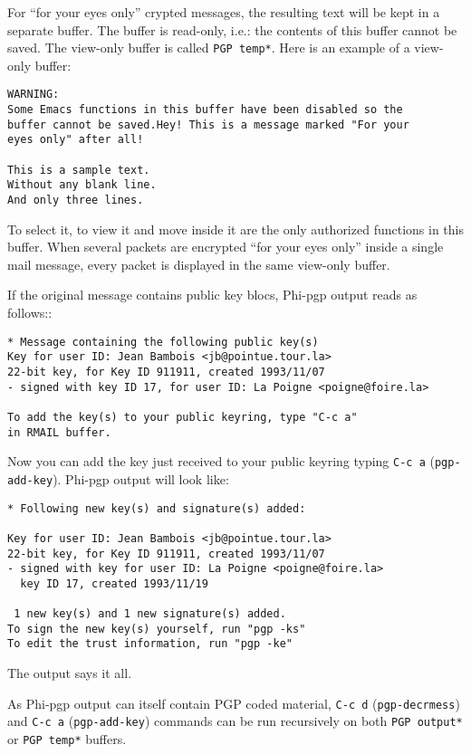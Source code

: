 For  ``for your eyes only'' crypted  messages, the resulting text will
be  kept in  a separate  buffer. The  buffer  is read-only,  i.e.: the
contents  of this buffer cannot    be saved. The view-only buffer   is
called {\tt *PGP temp*}. Here is an example of a view-only buffer:

\begin{verbatim}
WARNING:
Some Emacs functions in this buffer have been disabled so the 
buffer cannot be saved.Hey! This is a message marked "For your 
eyes only" after all!

This is a sample text.
Without any blank line.
And only three lines.
\end{verbatim}

To  select it, to view it  and move inside it  are the only authorized
functions  in this buffer. When  several  packets are encrypted  ``for
your  eyes only'' inside  a  single   mail message,  every  packet  is
displayed in the same view-only buffer.

\medskip
If  the  original message contains   public  key blocs, Phi-pgp output
reads as follows::

\begin{verbatim}
* Message containing the following public key(s)
Key for user ID: Jean Bambois <jb@pointue.tour.la>
22-bit key, for Key ID 911911, created 1993/11/07
- signed with key ID 17, for user ID: La Poigne <poigne@foire.la>

To add the key(s) to your public keyring, type "C-c a" 
in RMAIL buffer.
\end{verbatim}

Now you can add  the key just received  to your public keyring typing
{\tt C-c a} ({\tt pgp-add-key}).  Phi-pgp output will look like:

\begin{verbatim}
* Following new key(s) and signature(s) added:

Key for user ID: Jean Bambois <jb@pointue.tour.la>
22-bit key, for Key ID 911911, created 1993/11/07
- signed with key for user ID: La Poigne <poigne@foire.la>
  key ID 17, created 1993/11/19

 1 new key(s) and 1 new signature(s) added.
To sign the new key(s) yourself, run "pgp -ks"
To edit the trust information, run "pgp -ke"
\end{verbatim}

The output says it all.

As Phi-pgp output  can itself contain  PGP coded material, {\tt C-c d}
({\tt pgp-decr\-mess}) and {\tt C-c a} ({\tt pgp-add-key}) commands can
be run recursively on both   {\tt *PGP output*}   or {\tt *PGP  temp*}
buffers.

